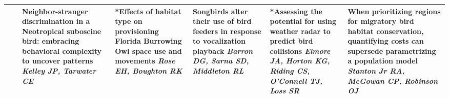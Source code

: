 \begin{tabular}{|x{0.75cm}|a{2.25cm}|x{2.25cm}|x{2.25cm}|x{2.25cm}|x{2.25cm}|x{2.25cm}|}
\hline
{}& \newline \newline \textit{} & Neighbor-stranger discrimination in a Neotropical suboscine bird: embracing behavioral complexity to uncover patterns \newline \newline \textit{Kelley JP, Tarwater CE} & *Effects of habitat type on provisioning Florida Burrowing Owl space use and movements \newline \newline \textit{Rose EH, Boughton RK} & Songbirds alter their use of bird feeders in response to vocalization playback \newline \newline \textit{Barron DG, Sarna SD, Middleton RL} & *Assessing the potential for using weather radar to predict bird collisions \newline \newline \textit{Elmore JA, Horton KG, Riding CS, O'Connell TJ, Loss SR} & When prioritizing regions for migratory bird habitat conservation, quantifying costs can supersede parametrizing a population model \newline \newline \textit{Stanton Jr RA, McGowan CP, Robinson OJ}\\
\hline
\end{tabular}
